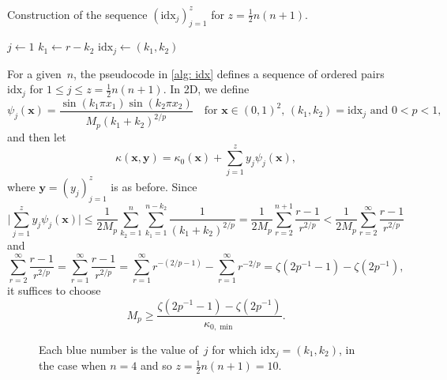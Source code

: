\documentclass[a4paper,12pt]{article}
\newcommand{\bs}[1]{\boldsymbol{#1}}
\newcommand{\idx}{\mathrm{idx}}
\begin{document}
\begin{algorithm}[t]
\caption{Construction of the sequence $(\idx_j)_{j=1}^z$
for $z=\tfrac12n(n+1)$.} \label{alg: idx}
\begin{algorithmic}
\State $j\gets 1$
        \State $k_1\gets r-k_2$
        \State $\idx_j\gets(k_1,k_2)$
    \EndFor
\EndFor
\end{algorithmic}
\end{algorithm}

For a given~$n$, the pseudocode in \cref{alg: idx} defines a sequence
of ordered pairs~$\idx_j$ for $1\le j\le z=\tfrac12n(n+1)$.  In 2D, we define
\[
\psi_j(\bs{x})=\frac{\sin(k_1\pi x_1)\sin(k_2\pi x_2)}{M_p(k_1+k_2)^{2/p}}
\quad\text{for $\bs{x}\in(0,1)^2$, $(k_1,k_2)=\idx_j$ and $0<p<1$,}
\]
and then let
\[
\kappa(\bs{x},\bs{y})=\kappa_0(\bs{x})+\sum_{j=1}^z y_j\psi_j(\bs{x}),
\]
where $\bs{y}=(y_j)_{j=1}^z$ is as before. Since
\[
\biggl|\sum_{j=1}^zy_j\psi_j(\bs{x})\biggr|\le\frac{1}{2M_p}\sum_{k_2=1}^n
    \sum_{k_1=1}^{n-k_2}\frac{1}{(k_1+k_2)^{2/p}}
    =\frac{1}{2M_p}\sum_{r=2}^{n+1}\frac{r-1}{r^{2/p}}
    <\frac{1}{2M_p}\sum_{r=2}^\infty\frac{r-1}{r^{2/p}}
\]
and
\[
\sum_{r=2}^\infty\frac{r-1}{r^{2/p}}=\sum_{r=1}^\infty\frac{r-1}{r^{2/p}}
    =\sum_{r=1}^\infty r^{-(2/p-1)}
    -\sum_{r=1}^\infty r^{-2/p}
    =\zeta(2p^{-1}-1)-\zeta(2p^{-1}),
\]
it suffices to choose
\[
M_p\ge\frac{\zeta(2p^{-1}-1)-\zeta(2p^{-1})}{\kappa_{0,\min}}.
\]

\begin{figure}
\caption{Each blue number is the value of~$j$ for which $\idx_j=(k_1,k_2)$, in
the case when $n=4$ and so $z=\tfrac12n(n+1)=10$.}
\label{fig: idx}
\begin{center}
\end{center}
\end{figure}

\end{document}

